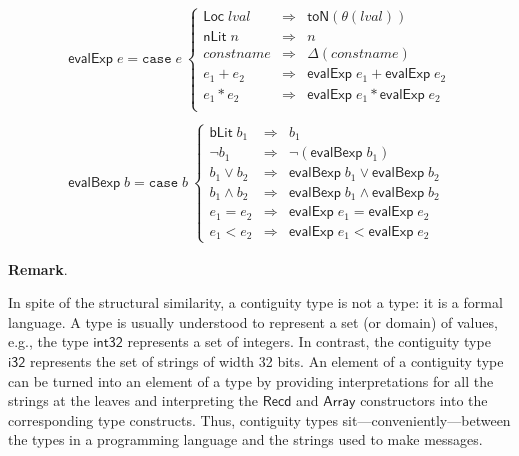 \documentclass[svgnames]{llncs}
\newcommand{\eg}{e.g.}
\newcommand{\konst}[1]{\ensuremath{\mathsf{#1}}}
\newcommand{\lval}{\ensuremath{\mathit{lval}}}
\begin{document}
\[
\begin{array}{l}
\konst{evalExp} \; e =
\mathtt{case}\; e\
 \left\{
 \begin{array}{lcl}
    \konst{Loc}\; \lval & \Rightarrow & \konst{toN}(\theta(\lval)) \\
    \konst{nLit}\; n & \Rightarrow & n  \\
    \mathit{constname} & \Rightarrow & \Delta(\mathit{constname})  \\
    e_1 + e_2 & \Rightarrow & \konst{evalExp}\; e_1 + \konst{evalExp}\; e_2  \\
    e_1 * e_2 & \Rightarrow & \konst{evalExp}\; e_1 * \konst{evalExp}\; e_2  \\
  \end{array}
 \right.
 \\ \\
\konst{evalBexp} \; b =
\mathtt{case}\; b\
 \left\{
 \begin{array}{lcl}
    \konst{bLit}\; b_1 & \Rightarrow & b_1 \\
    \neg b_1 & \Rightarrow & \neg(\konst{evalBexp} \; b_1)  \\
    b_1 \lor b_2 & \Rightarrow & \konst{evalBexp} \;b_1 \lor \konst{evalBexp} \;b_2   \\
    b_1 \land b_2 & \Rightarrow & \konst{evalBexp} \;b_1 \land \konst{evalBexp} \;b_2   \\
    e_1 = e_2 & \Rightarrow & \konst{evalExp} \;e_1 = \konst{evalExp} \;e_2   \\
    e_1 < e_2 & \Rightarrow & \konst{evalExp} \;e_1 < \konst{evalExp} \;e_2
  \end{array}
 \right.

\end{array}
\]

\noindent\textbf{Remark}.

In spite of the structural similarity, a contiguity type is not a
type: it is a formal language. A type is usually understood to
represent a set (or domain) of values, \eg, the type \konst{int32}
represents a set of integers. In contrast, the contiguity type
\konst{i32} represents the set of strings of width 32 bits. An element
of a contiguity type can be turned into an element of a type by
providing interpretations for all the strings at the leaves and
interpreting the \konst{Recd} and \konst{Array} constructors into the
corresponding type constructs. Thus, contiguity types
sit---conveniently---between the types in a programming language and
the strings used to make messages.
\end{document}
